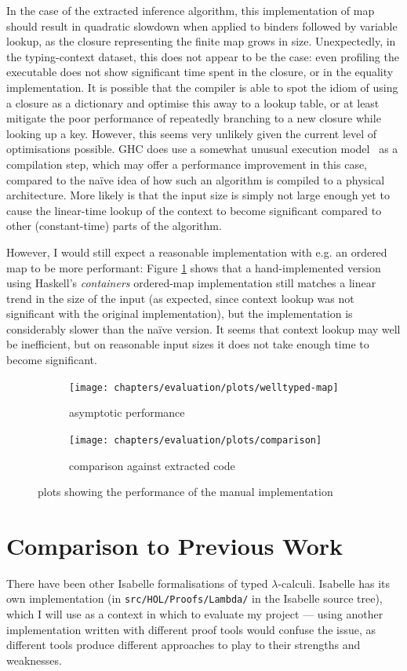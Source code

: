 In the case of the extracted inference algorithm, this implementation of map should result in quadratic slowdown when applied to binders followed by variable lookup, as the closure representing the finite map grows in size.
Unexpectedly, in the typing-context dataset, this does not appear to be the case: even profiling the executable does not show significant time spent in the closure, or in the equality implementation.
It is possible that the compiler is able to spot the idiom of using a closure as a dictionary and optimise this away to a lookup table, or at least mitigate the poor performance of repeatedly branching to a new closure while looking up a key.
However, this seems very unlikely given the current level of optimisations possible.
GHC does use a somewhat unusual execution model~\cite{STG} as a compilation step, which may offer a performance improvement in this case, compared to the na\"ive idea of how such an algorithm is compiled to a physical architecture.
More likely is that the input size is simply not large enough yet to cause the linear-time lookup of the context to become significant compared to other (constant-time) parts of the algorithm.

However, I would still expect a reasonable implementation with e.g. an ordered map to be more performant: Figure \ref{fig:results-map} shows that a hand-implemented version using Haskell's \emph{containers} ordered-map implementation still matches a linear trend in the size of the input (as expected, since context lookup was not significant with the original implementation), but the implementation is considerably slower than the na\"ive version.
It seems that context lookup may well be inefficient, but on reasonable input sizes it does not take enough time to become significant.

\begin{figure}
\begin{subfigure}{.49\textwidth}
 \centering
 \texttt{[image: chapters/evaluation/plots/welltyped-map]}
 \caption{asymptotic performance}
\end{subfigure}
\begin{subfigure}{.49\textwidth}
 \centering
 \texttt{[image: chapters/evaluation/plots/comparison]}
 \caption{comparison against extracted code}
\end{subfigure}
\caption{plots showing the performance of the manual implementation}
\label{fig:results-map}
\end{figure}

\section{Comparison to Previous Work}
\label{sec:comparison}
There have been other Isabelle formalisations of typed \(\lambda\)-calculi.
Isabelle has its own implementation (in \texttt{src/HOL/Proofs/Lambda/} in the Isabelle source tree), which I will use as a context in which to evaluate my project --- using another implementation written with different proof tools would confuse the issue, as different tools produce different approaches to play to their strengths and weaknesses.

